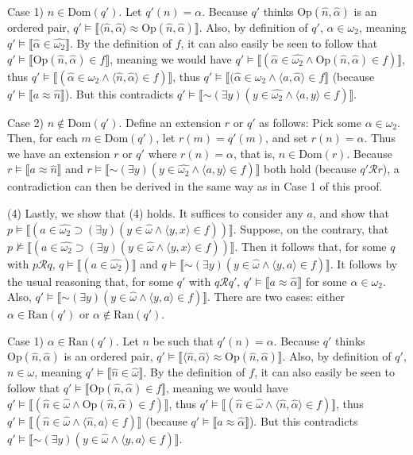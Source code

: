 \documentclass{article}
\newcommand*{\oldneg}{\mathord{\sim}}
\newcommand{\lbc}{\llbracket}
\newcommand{\rbc}{\rrbracket}
\theoremstyle{definition}
\begin{document}
Case 1) $n\in\textrm{Dom}(q')$. Let $q'(n)=\alpha$. Because $q'$ thinks $\textrm{Op}(\hat{n},\hat{\alpha})$ is an ordered pair, 
$q'\vDash\lbc\langle\hat{n},\hat{\alpha}\rangle\approx\textrm{Op}(\hat{n},\hat{\alpha})\rbc$. Also, by definition of $q'$, 
$\alpha\in\omega_2$, meaning $q'\vDash\lbc\hat{\alpha}\in\hat{\omega_2}\rbc$. By the definition of $f$, it can also easily be 
seen to follow that $q'\vDash\lbc\textrm{Op}(\hat{n},\hat{\alpha})\in f\rbc$, meaning we would have 
$q'\vDash\lbc (\hat{\alpha}\in\hat{\omega_2}\wedge\textrm{Op}(\hat{n},\hat{\alpha})\in f)\rbc$, thus 
$q'\vDash\lbc (\hat{\alpha}\in\hat{\omega_2}\wedge\langle\hat{n},\hat{\alpha}\rangle\in f)\rbc$, thus 
$q'\vDash\lbc (\hat{\alpha}\in\hat{\omega_2}\wedge\langle a,\hat{\alpha}\rangle\in f\rbc$ (because $q'\vDash\lbc a\approx\hat{n}\rbc$). 
But this contradicts $q'\vDash\lbc\oldneg(\exists y)(y\in\hat{\omega_2}\wedge\langle a,y\rangle\in f)\rbc$.

Case 2) $n\notin\textrm{Dom}(q')$. Define an extension $r$ or $q'$ as follows: Pick some $\alpha\in\omega_2$. Then, for each 
$m\in\textrm{Dom}(q')$, let $r(m)=q'(m)$, and set $r(n)=\alpha$. Thus we have an extension $r$ or $q'$ where $r(n)=\alpha$, that 
is, $n\in\textrm{Dom}(r)$. Because $r\vDash\lbc a\approx\hat{n}\rbc$ and $r\vDash\lbc\oldneg(\exists y)(y\in\hat{\omega_2}\wedge\langle a,y\rangle\in f)\rbc$ 
both hold (because $q'\mathcal{R}r$), a contradiction can then be derived in the same way as in Case 1 of this proof.

(4) Lastly, we show that (4) holds. It suffices to consider any $a$, and show that 
$p\vDash\lbc(a\in\widehat{\omega_2}\supset(\exists y)(y\in\hat{\omega}\wedge\langle y,x\rangle\in f))\rbc$. Suppose, on the 
contrary, that $p\nvDash\lbc(a\in\widehat{\omega_2}\supset(\exists y)(y\in\hat{\omega}\wedge\langle y,x\rangle\in f))\rbc$. Then it follows that, 
for some $q$ with $p\mathcal{R}q$, $q\vDash\lbc(a\in\widehat{\omega_2})\rbc$ and $q\vDash\lbc\oldneg(\exists y)(y\in\hat{\omega}\wedge\langle y,a\rangle\in f)\rbc$.
It follows by the usual reasoning that, for some $q'$ with 
$q\mathcal{R}q'$, $q'\vDash\lbc a\approx\hat{\alpha}\rbc$ for some $\alpha\in\omega_2$. Also,
$q'\vDash\lbc\oldneg(\exists y)(y\in\hat{\omega}\wedge\langle y,a\rangle\in f)\rbc$. There are two cases: 
either $\alpha\in\textrm{Ran}(q')$ or $\alpha\notin\textrm{Ran}(q')$.

Case 1) $\alpha\in\textrm{Ran}(q')$. Let $n$ be such that $q'(n)=\alpha$. Because $q'$ thinks 
$\textrm{Op}(\hat{n},\hat{\alpha})$ is an ordered pair, $q'\vDash\lbc\langle\hat{n},\hat{\alpha}\rangle\approx\textrm{Op}(\hat{n},\hat{\alpha})\rbc$. 
Also, by definition of $q'$, $n\in\omega$, meaning $q'\vDash\lbc\hat{n}\in\hat{\omega}\rbc$. By the definition of $f$, it can also easily be seen to follow that
$q'\vDash\lbc\textrm{Op}(\hat{n},\hat{\alpha})\in f\rbc$, meaning we would have $q'\vDash\lbc (\hat{n}\in\hat{\omega}\wedge\textrm{Op}(\hat{n},\hat{\alpha})\in f)\rbc$,
thus $q'\vDash\lbc(\hat{n}\in\hat{\omega}\wedge\langle\hat{n},\hat{\alpha}\rangle\in f)\rbc$, 
thus $q'\vDash\lbc(\hat{n}\in\hat{\omega}\wedge\langle\hat{n},a\rangle\in f)\rbc$ (because $q'\vDash\lbc a\approx\hat{\alpha}\rbc$). But this 
contradicts $q'\vDash\lbc\oldneg(\exists y)(y\in\hat{\omega}\wedge\langle y,a\rangle\in f)\rbc$.
\end{document}
